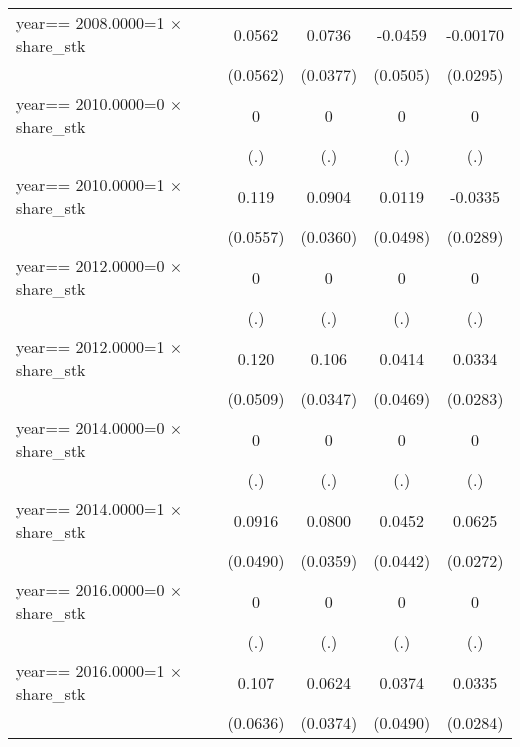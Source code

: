 \begin{table}[htbp]
\begin{tabular}{l*{4}{c}}
year==  2008.0000=1 $\times$ share\_stk&   0.0562         &   0.0736\sym{*}  &  -0.0459         & -0.00170         \\
                & (0.0562)         & (0.0377)         & (0.0505)         & (0.0295)         \\
year==  2010.0000=0 $\times$ share\_stk&        0         &        0         &        0         &        0         \\
                &      (.)         &      (.)         &      (.)         &      (.)         \\
year==  2010.0000=1 $\times$ share\_stk&    0.119\sym{**} &   0.0904\sym{**} &   0.0119         &  -0.0335         \\
                & (0.0557)         & (0.0360)         & (0.0498)         & (0.0289)         \\
year==  2012.0000=0 $\times$ share\_stk&        0         &        0         &        0         &        0         \\
                &      (.)         &      (.)         &      (.)         &      (.)         \\
year==  2012.0000=1 $\times$ share\_stk&    0.120\sym{**} &    0.106\sym{***}&   0.0414         &   0.0334         \\
                & (0.0509)         & (0.0347)         & (0.0469)         & (0.0283)         \\
year==  2014.0000=0 $\times$ share\_stk&        0         &        0         &        0         &        0         \\
                &      (.)         &      (.)         &      (.)         &      (.)         \\
year==  2014.0000=1 $\times$ share\_stk&   0.0916\sym{*}  &   0.0800\sym{**} &   0.0452         &   0.0625\sym{**} \\
                & (0.0490)         & (0.0359)         & (0.0442)         & (0.0272)         \\
year==  2016.0000=0 $\times$ share\_stk&        0         &        0         &        0         &        0         \\
                &      (.)         &      (.)         &      (.)         &      (.)         \\
year==  2016.0000=1 $\times$ share\_stk&    0.107\sym{*}  &   0.0624\sym{*}  &   0.0374         &   0.0335         \\
                & (0.0636)         & (0.0374)         & (0.0490)         & (0.0284)         \\

\end{tabular}
\end{table}
